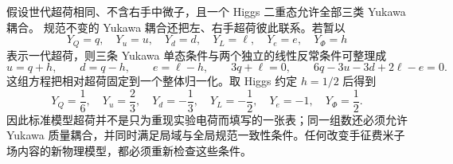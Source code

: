 \begin{proposition}[最小场谱的相对超荷]
假设世代超荷相同、不含右手中微子，且一个 Higgs 二重态允许全部三类 Yukawa 耦合。
规范不变的 Yukawa 耦合还把左、右手超荷彼此联系。若暂以
\begin{equation*}
 Y_Q=q,\quad Y_u=u,\quad Y_d=d,\quad
 Y_L=\ell,\quad Y_e=e,\quad Y_\Phi=h
\end{equation*}
表示一代超荷，则三条 Yukawa 单态条件与两个独立的线性反常条件可整理成
\begin{equation}
\boxed{
 u=q+h,\qquad d=q-h,\qquad e=\ell-h,\qquad
 3q+\ell=0,\qquad
 6q-3u-3d+2\ell-e=0.}
\label{eq:sm-hypercharge-constraint-system-dp68}
\end{equation}
这组方程把相对超荷固定到一个整体归一化。取 Higgs 约定 $h=1/2$ 后得到
\begin{equation}
 \boxed{
 Y_Q=\frac16,\quad Y_u=\frac23,\quad Y_d=-\frac13,\quad
 Y_L=-\frac12,\quad Y_e=-1,\quad Y_\Phi=\frac12.}
 \label{eq:sm-hypercharge-solution-dp32}
\end{equation}
因此标准模型超荷并不是只为重现实验电荷而填写的一张表；同一组数还必须允许 Yukawa 质量耦合，并同时满足局域与全局规范一致性条件。任何改变手征费米子场内容的新物理模型，都必须重新检查这些条件。

\end{proposition}

